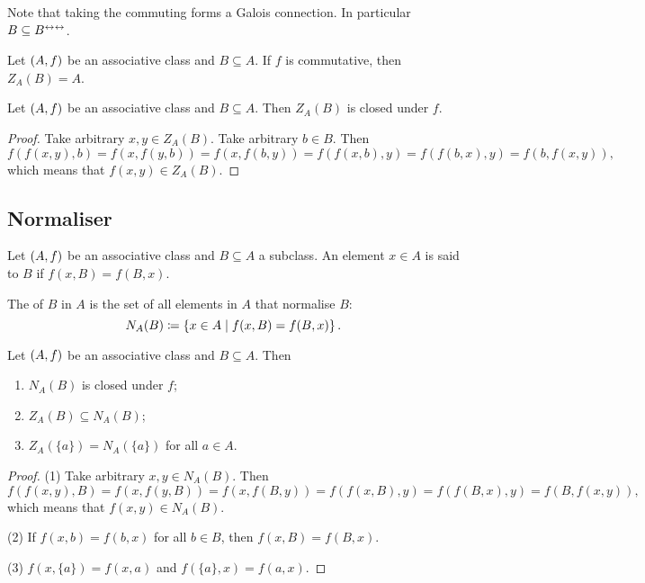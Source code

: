 Note that taking the commuting forms a Galois connection. In particular $B \subseteq B^{\leftrightarrow\leftrightarrow}$.

\begin{lemma}
Let $\left( A,f \right)$ be an associative class and $B\subseteq A$. If $f$ is commutative, then $Z_A(B) = A$.
\end{lemma}

\begin{proposition}
Let $\left( A,f \right)$ be an associative class and $B\subseteq A$. Then $Z_A(B)$ is closed under $f$.
\end{proposition}
\begin{proof}
Take arbitrary $x,y\in Z_A(B)$. Take arbitrary $b\in B$. Then
\[ f(f(x,y),b) = f(x,f(y,b)) = f(x,f(b,y)) = f(f(x,b),y) = f(f(b,x),y) = f(b,f(x,y)), \]
which means that $f(x,y)\in Z_A(B)$.
\end{proof}

\subsection{Normaliser}
\begin{definition}
Let $\left( A,f \right)$ be an associative class and $B\subseteq A$ a subclass. An element $x\in A$ is said to  $B$ if $f(x,B) = f(B,x)$.

The  of $B$ in $A$ is the set of all elements in $A$ that normalise $B$:
\[ N_A(B) \coloneqq \left\{ x\in A \;\middle|\; f(x,B) = f(B,x) \right\}. \]
\end{definition}

\begin{proposition}
Let $\left( A,f \right)$ be an associative class and $B\subseteq A$. Then
\begin{enumerate}
\item $N_A(B)$ is closed under $f$;
\item $Z_A(B) \subseteq N_A(B)$;
\item $Z_A(\{a\}) = N_A(\{a\})$ for all $a\in A$.
\end{enumerate}
\end{proposition}
\begin{proof}
(1) Take arbitrary $x,y\in N_A(B)$. Then
\[ f(f(x,y),B) = f(x,f(y,B)) = f(x,f(B,y)) = f(f(x,B),y) = f(f(B,x),y) = f(B,f(x,y)), \]
which means that $f(x,y)\in N_A(B)$.

(2) If $f(x,b) = f(b,x)$ for all $b\in B$, then $f(x,B) = f(B,x)$.

(3) $f(x,\{a\}) = f(x,a)$ and $f(\{a\}, x) = f(a,x)$.
\end{proof}

